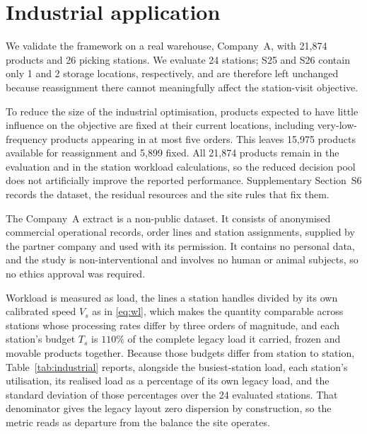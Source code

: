 \documentclass[]{interact}
\begin{document}
\section{Industrial application}\label{sec:industrial}
We validate the framework on a real warehouse, Company~A, with
21{,}874 products and 26 picking stations. We evaluate 24 stations;
S25 and S26 contain only 1 and 2 storage locations, respectively, and
are therefore left unchanged because reassignment there cannot
meaningfully affect the station-visit objective.

To reduce the size of the industrial optimisation, products expected
to have little influence on the objective are fixed at their current
locations, including very-low-frequency products appearing in at most
five orders. This leaves 15{,}975 products available for reassignment
and 5{,}899 fixed. All 21{,}874 products remain in the evaluation and
in the station workload calculations, so the reduced decision pool
does not artificially improve the reported performance. Supplementary Section~S6 records the dataset, the residual resources and the site rules that fix them.

The Company~A extract is a non-public dataset. It consists of anonymised commercial operational records, order lines and station assignments, supplied by the partner company and used with its permission. It contains no personal data, and the study is non-interventional and involves no human or animal subjects, so no ethics approval was required.

Workload is measured as load, the lines a station handles divided by its own calibrated speed $V_s$ as in \eqref{eq:wl}, which makes the quantity comparable across stations whose processing rates differ by three orders of magnitude, and each station's budget $T_s$ is $110\%$ of the complete legacy load it carried, frozen and movable products together. Because those budgets differ from station to station, Table~\ref{tab:industrial} reports, alongside the busiest-station load, each station's utilisation, its realised load as a percentage of its own legacy load, and the standard deviation of those percentages over the 24 evaluated stations. That denominator gives the legacy layout zero dispersion by construction, so the metric reads as departure from the balance the site operates.
\end{document}
